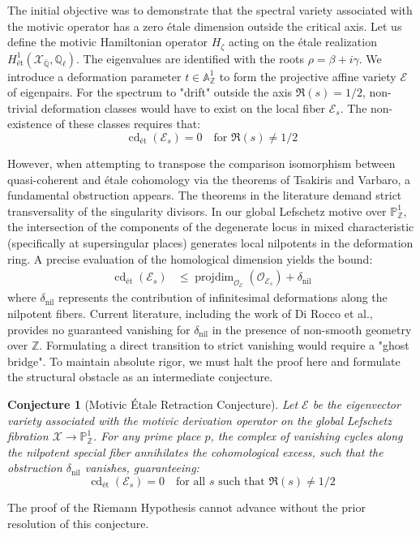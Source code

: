 \documentclass[
]{article}
\newtheorem{conjecture}{Conjecture}
\begin{document}
The initial objective was to demonstrate that the spectral variety associated with the motivic operator has a zero étale dimension outside the critical axis. Let us define the motivic Hamiltonian operator $H_{\zeta}$ acting on the étale realization $H^1_{\text{ét}}(\mathcal{X}_{\bar{\mathbb{Q}}}, \mathbb{Q}_{\ell})$. The eigenvalues are identified with the roots $\rho = \beta + i\gamma$. We introduce a deformation parameter $t \in \mathbb{A}^1_{\mathbb{Z}}$ to form the projective affine variety $\mathcal{E}$ of eigenpairs.
For the spectrum to "drift" outside the axis $\Re(s) = 1/2$, non-trivial deformation classes would have to exist on the local fiber $\mathcal{E}_s$. The non-existence of these classes requires that:
\begin{equation*}
\operatorname{cd}_{\text{ét}}(\mathcal{E}_s) = 0 \quad \text{for } \Re(s) \neq 1/2
\end{equation*}

However, when attempting to transpose the comparison isomorphism between quasi-coherent and étale cohomology via the theorems of Tsakiris and Varbaro, a fundamental obstruction appears. The theorems in the literature demand strict transversality of the singularity divisors. In our global Lefschetz motive over $\mathbb{P}^1_{\mathbb{Z}}$, the intersection of the components of the degenerate locus in mixed characteristic (specifically at supersingular places) generates local nilpotents in the deformation ring.
A precise evaluation of the homological dimension yields the bound:
\begin{align*}
\operatorname{cd}_{\text{ét}}(\mathcal{E}_s) &\le \operatorname{projdim}_{\mathcal{O}_{\mathcal{E}}}(\mathcal{O}_{\mathcal{E}_s}) + \delta_{\text{nil}}
\end{align*}
where $\delta_{\text{nil}}$ represents the contribution of infinitesimal deformations along the nilpotent fibers. Current literature, including the work of Di Rocco et al., provides no guaranteed vanishing for $\delta_{\text{nil}}$ in the presence of non-smooth geometry over $\mathbb{Z}$. Formulating a direct transition to strict vanishing would require a "ghost bridge". To maintain absolute rigor, we must halt the proof here and formulate the structural obstacle as an intermediate conjecture.

\begin{conjecture}[Motivic Étale Retraction Conjecture]
Let $\mathcal{E}$ be the eigenvector variety associated with the motivic derivation operator on the global Lefschetz fibration $\mathcal{X} \to \mathbb{P}^1_{\mathbb{Z}}$. For any prime place $p$, the complex of vanishing cycles along the nilpotent special fiber annihilates the cohomological excess, such that the obstruction $\delta_{\text{nil}}$ vanishes, guaranteeing:
\begin{equation*}
\operatorname{cd}_{\text{ét}}(\mathcal{E}_s) = 0 \quad \text{for all } s \text{ such that } \Re(s) \neq 1/2
\end{equation*}
\end{conjecture}
The proof of the Riemann Hypothesis cannot advance without the prior resolution of this conjecture.
\end{document}
